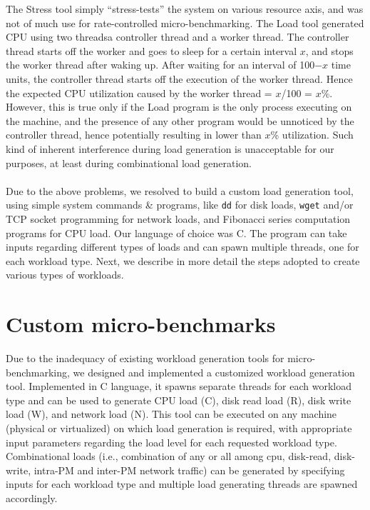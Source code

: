 The Stress tool simply ``stress-tests'' the 
system on various resource axis, and was not of much use 
for rate-controlled micro-benchmarking.
The Load tool generated CPU using two threads\textemdash{}a controller 
thread and a worker thread.
The controller thread starts off the worker and goes to sleep 
for a certain interval $x$, and stops
the worker thread after waking up. After waiting for an interval 
of 100−$x$ time units, the controller thread
starts off the execution of the worker thread. Hence the 
expected CPU utilization caused by the worker thread = $x$/100 = $x$\%. 
However, this is true only if the Load program is the only process executing
on the machine, and the presence of any other program would 
be unnoticed by the controller
thread, hence potentially resulting in lower than $x$\% utilization. 
Such kind of inherent 
interference during load generation is unacceptable for our 
purposes, at least during combinational load generation.
\\
\\
Due to the above problems, we resolved to build a custom load 
generation tool, using simple system commands \& programs, like 
\texttt{dd} for disk loads, \texttt{wget} and/or TCP socket programming 
for network loads, and Fibonacci series computation programs for 
CPU load. Our language of choice was C. The program can take
inputs regarding different types of loads and can spawn multiple 
threads, one for each workload type. Next, we describe in more detail 
the steps adopted to create various types of workloads.

\section{Custom micro-benchmarks}
Due to the inadequacy of existing workload generation tools for micro-benchmarking, we 
designed and implemented a customized workload generation tool. Implemented in C language,
it spawns separate threads for each workload type and can be used to generate CPU load (C),
disk read load (R), disk write load (W), and network load (N). This tool can be executed on
any machine (physical or virtualized) on which load generation is required, with appropriate
input parameters regarding the load level for each requested workload type. Combinational loads
(i.e., combination of any or all among cpu, disk-read, disk-write, intra-PM and inter-PM
network traffic)
can be generated by specifying inputs for each workload type and multiple load generating
threads are spawned accordingly. 

